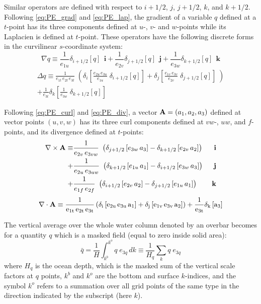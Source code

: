 \documentclass[../main/NEMO_manual]{subfiles}
\begin{document}
Similar operators are defined with respect to $i+1/2$, $j$, $j+1/2$, $k$, and $k+1/2$.
Following \autoref{eq:PE_grad} and \autoref{eq:PE_lap}, the gradient of a variable $q$ defined at
a $t$-point has its three components defined at $u$-, $v$- and $w$-points while
its Laplacien is defined at $t$-point.
These operators have the following discrete forms in the curvilinear $s$-coordinate system:
\[
  \nabla q\equiv 	\frac{1}{e_{1u} } \delta_{i+1/2 } [q] \;\,\mathbf{i}
  +	\frac{1}{e_{2v} } \delta_{j+1/2 } [q] \;\,\mathbf{j}
  +	\frac{1}{e_{3w}} \delta_{k+1/2} [q] \;\,\mathbf{k}
\]
\begin{multline*}
  \Delta q\equiv \frac{1}{e_{1t}\,e_{2t}\,e_{3t} }
  \;\left(          \delta_i  \left[ \frac{e_{2u}\,e_{3u}} {e_{1u}} \;\delta_{i+1/2} [q] \right]
    +                        \delta_j  \left[ \frac{e_{1v}\,e_{3v}}  {e_{2v}} \;\delta_{j+1/2} [q] \right] \;  \right)		\\
  +\frac{1}{e_{3t}} \delta_k \left[ \frac{1}{e_{3w} }                     \;\delta_{k+1/2} [q] \right]
\end{multline*}

Following \autoref{eq:PE_curl} and \autoref{eq:PE_div}, a vector ${\rm {\bf A}}=\left( a_1,a_2,a_3\right)$
defined at vector points $(u,v,w)$ has its three curl components defined at $vw$-, $uw$, and $f$-points,
and its divergence defined at $t$-points:
\begin{align*}
  \nabla \times {\rm{\bf A}}\equiv &
                                     \frac{1}{e_{2v}\,e_{3vw} } \ \left( \delta_{j +1/2} \left[e_{3w}\,a_3 \right] -\delta_{k+1/2} \left[e_{2v} \,a_2 \right] \right)  &\ \mathbf{i} \\
  +& \frac{1}{e_{2u}\,e_{3uw}} \ \left( \delta_{k+1/2} \left[e_{1u}\,a_1  \right] -\delta_{i +1/2} \left[e_{3w}\,a_3 \right] \right)  &\ \mathbf{j} \\
  +& \frac{1}{e_{1f} \,e_{2f}    } \ \left( \delta_{i +1/2} \left[e_{2v}\,a_2  \right] -\delta_{j +1/2} \left[e_{1u}\,a_1 \right] \right)  &\ \mathbf{k}
\end{align*}
\begin{align*}
  \nabla \cdot \rm{\bf A} \equiv
  \frac{1}{e_{1t}\,e_{2t}\,e_{3t}} \left( \delta_i \left[e_{2u}\,e_{3u}\,a_1 \right]
  +\delta_j \left[e_{1v}\,e_{3v}\,a_2 \right] \right)+\frac{1}{e_{3t} }\delta_k \left[a_3 \right]
\end{align*}

The vertical average over the whole water column denoted by an overbar becomes for a quantity $q$ which
is a masked field (\ie equal to zero inside solid area):
\begin{equation}
  \label{eq:DOM_bar}
  \bar q 	=         \frac{1}{H}    \int_{k^b}^{k^o} {q\;e_{3q} \,dk}
  \equiv \frac{1}{H_q }\sum\limits_k {q\;e_{3q} }
\end{equation}
where $H_q$  is the ocean depth, which is the masked sum of the vertical scale factors at $q$ points,
$k^b$ and $k^o$ are the bottom and surface $k$-indices,
and the symbol $k^o$ refers to a summation over all grid points of the same type in the direction indicated by
the subscript (here $k$). 
\end{document}

